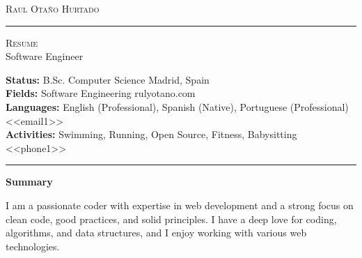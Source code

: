 \documentclass[10pt,A4]{article}
\newcommand{\cvsection}[1]
{
	\begin{center}
		\large\textcolor{sectcol}{\textbf{#1}}
	\end{center}
}
\newcommand{\metasection}[2]
{
\footnotesize{#2} \hspace*{\fill} \footnotesize{#1}\\[1pt]
}
\begin{document}
\pagestyle{fancy}	








\vspace{-8pt}
\begin{center}
	\HUGE \textsc{Raul Otaño Hurtado} \textcolor{sectcol}{\rule[-1mm]{1mm}{0.9cm}} \textsc{Resume}\\[2pt]
	\small Software Engineer
\end{center}



\vspace{6pt}


\metasection{Madrid, Spain}{\textbf{Status:} B.Sc. Computer Science}
\metasection{rulyotano.com}{\textbf{Fields:} Software Engineering} 
\metasection{<<email1>>}{\textbf{Languages:} English (Professional), Spanish (Native), Portuguese (Professional)}
\metasection{<<phone1>>}{\textbf{Activities:} Swimming, Running, Open Source, Fitness, Babysitting}
\vspace{-2pt}
\textcolor{softcol}{\hrule}
\vspace{6pt}

\normalsize

\vspace{-6pt}
\cvsection{Summary}
I am a passionate coder with expertise in web development and a strong focus on clean code, good practices, and solid principles. I have a deep love for coding, algorithms, and data structures, and I enjoy working with various web technologies.\\
\end{document}
